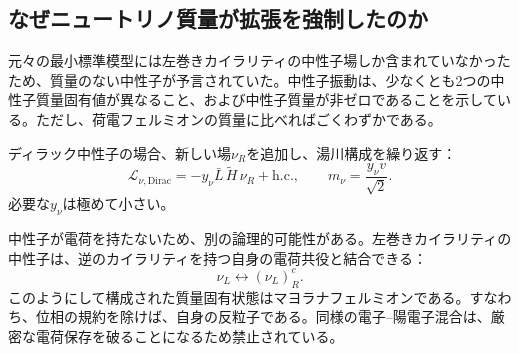 \subsection{なぜニュートリノ質量が拡張を強制したのか}

元々の最小標準模型には左巻きカイラリティの中性子場しか含まれていなかったため、質量のない中性子が予言されていた。中性子振動は、少なくとも2つの中性子質量固有値が異なること、および中性子質量が非ゼロであることを示している。ただし、荷電フェルミオンの質量に比べればごくわずかである。

\begin{classroomqa}
\end{classroomqa}

ディラック中性子の場合、新しい場\(\nu_R\)を追加し、湯川構成を繰り返す：
\begin{equation}
  \mathcal L_{\nu,\mathrm{Dirac}}
  =-y_\nu\bar L\,\widetilde H\,\nu_R+\mathrm{h.c.},
  \qquad
  m_\nu=\frac{y_\nu v}{\sqrt2}.
  \label{eq:l09-dirac-neutrino}
\end{equation}
必要な\(y_\nu\)は極めて小さい。

中性子が電荷を持たないため、別の論理的可能性がある。左巻きカイラリティの中性子は、逆のカイラリティを持つ自身の電荷共役と結合できる：
\begin{equation}
  \nu_L\longleftrightarrow(\nu_L)^c_R .
  \label{eq:l09-majorana-mixing}
\end{equation}
このようにして構成された質量固有状態はマヨラナフェルミオンである。すなわち、位相の規約を除けば、自身の反粒子である。同様の電子--陽電子混合は、厳密な電荷保存を破ることになるため禁止されている。

\begin{classroomqa}
\end{classroomqa}

